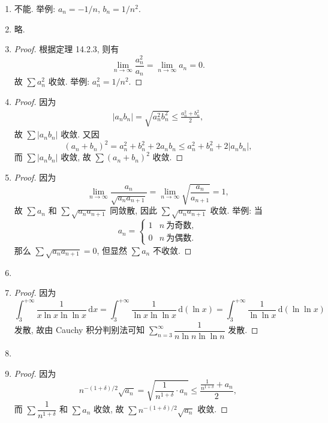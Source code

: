 \documentclass[a4paper, 11pt]{ctexart}
\begin{document}
\begin{enumerate}
    \item %
        不能. 举例: $a_n = -1/n$, $b_n = 1/n^2$.
    \item %
        略.
    \item %
        \begin{proof}
            根据定理 14.2.3, 则有
            \[
                \lim_{n\to\infty}\frac{a_n^2}{a_n} = \lim_{n\to\infty}a_n = 0.    
            \]
            故 $\sum a_n^2$ 收敛. 举例: $a_n^2 = 1/n^2$.
        \end{proof}
    \item %
        \begin{proof}
            因为
            \begin{align*}
                |a_nb_n| = \sqrt{a_n^2b_n^2} \leq \frac{a_n^2 + b_n^2}{2},
            \end{align*}
            故 $\sum|a_nb_n|$ 收敛.
            又因
            \[
                (a_n + b_n)^2 = a_n^2 + b_n^2 + 2a_nb_n \leq a_n^2 + b_n^2 + 2|a_nb_n|,    
            \]
            而 $\sum|a_nb_n|$ 收敛, 故 $\sum(a_n + b_n)^2$ 收敛.
        \end{proof}
    \item %
        \begin{proof}
            因为
            \[
                \lim_{n\to\infty}\frac{a_n}{\sqrt{a_na_{n+1}}} = \lim_{n\to\infty}\sqrt{\frac{a_n}{a_{n+1}}} = 1,   
            \]
            故 $\sum a_n$ 和 $\sum\sqrt{a_na_{n+1}}$ 同敛散, 因此 $\sum\sqrt{a_na_{n+1}}$ 收敛. 举例: 当
            \[
                a_n =
                \begin{cases}
                    1 & n\ \text{为奇数}, \\
                    0 & n\ \text{为偶数}.
                \end{cases}    
            \]
            那么 $\sum\sqrt{a_na_{n+1}} = 0$, 但显然 $\sum a_n$ 不收敛.
        \end{proof}
    \item %
    \item %
        \begin{proof}
            因为
            \[
                \int_3^{+\infty}\frac{1}{x\ln x\ln\ln x}\,\mathrm{d}x = \int_3^{+\infty}\frac{1}{\ln x\ln\ln x}\,\mathrm{d}(\ln x) = \int_3^{+\infty}\frac{1}{\ln\ln x}\,\mathrm{d}(\ln\ln x)    
            \]
            发散, 故由 Cauchy 积分判别法可知 $\sum\limits_{n=3}^\infty\dfrac{1}{n\ln n\ln\ln n}$ 发散.
        \end{proof}
    \item %
    \item %
        \begin{proof}
            因为
            \[
                n^{-(1+\delta)/2}\sqrt{a_n} = \sqrt{\frac{1}{n^{1+\delta}}\cdot a_n} \leq \frac{\frac{1}{n^{1+\delta}} + a_n}{2},    
            \]
            而 $\sum\dfrac{1}{n^{1+\delta}}$ 和 $\sum a_n$ 收敛, 故 $\sum n^{-(1+\delta)/2}\sqrt{a_n}$ 收敛.


\end{proof}
\end{enumerate}
\end{document}
